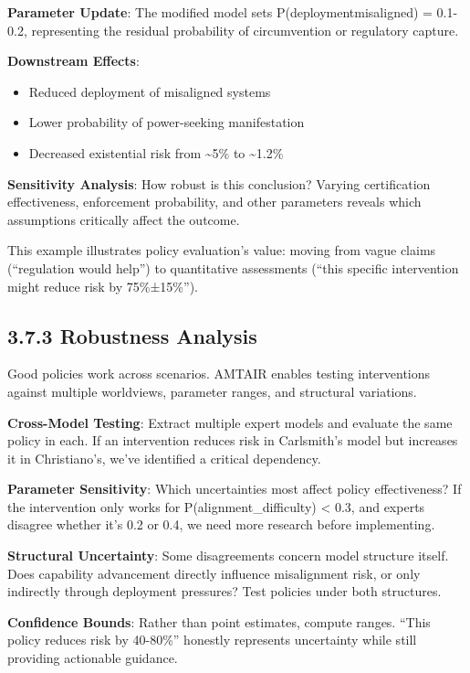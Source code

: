 \documentclass[
  11pt,
  letterpaper,
]{book}
\providecommand{\tightlist}{%
  \setlength{\itemsep}{0pt}\setlength{\parskip}{0pt}}
\begin{document}
\textbf{Parameter Update}: The modified model sets
P(deployment\textbar misaligned) = 0.1-0.2, representing the residual
probability of circumvention or regulatory capture.

\textbf{Downstream Effects}:

\begin{itemize}
\tightlist
\item
  Reduced deployment of misaligned systems
\item
  Lower probability of power-seeking manifestation
\item
  Decreased existential risk from \textasciitilde5\% to
  \textasciitilde1.2\%
\end{itemize}

\textbf{Sensitivity Analysis}: How robust is this conclusion? Varying
certification effectiveness, enforcement probability, and other
parameters reveals which assumptions critically affect the outcome.

This example illustrates policy evaluation's value: moving from vague
claims (``regulation would help'') to quantitative assessments (``this
specific intervention might reduce risk by 75\%±15\%'').

\subsection{3.7.3 Robustness Analysis}\label{sec-robustness}

Good policies work across scenarios. AMTAIR enables testing
interventions against multiple worldviews, parameter ranges, and
structural variations.

\textbf{Cross-Model Testing}: Extract multiple expert models and
evaluate the same policy in each. If an intervention reduces risk in
Carlsmith's model but increases it in Christiano's, we've identified a
critical dependency.

\textbf{Parameter Sensitivity}: Which uncertainties most affect policy
effectiveness? If the intervention only works for
P(alignment\_difficulty) \textless{} 0.3, and experts disagree whether
it's 0.2 or 0.4, we need more research before implementing.

\textbf{Structural Uncertainty}: Some disagreements concern model
structure itself. Does capability advancement directly influence
misalignment risk, or only indirectly through deployment pressures? Test
policies under both structures.

\textbf{Confidence Bounds}: Rather than point estimates, compute ranges.
``This policy reduces risk by 40-80\%'' honestly represents uncertainty
while still providing actionable guidance.
\end{document}

